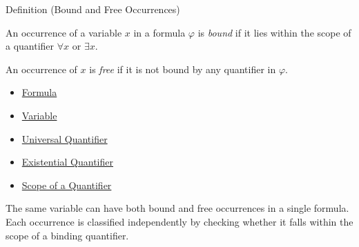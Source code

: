 \begin{definitionbox}{Definition (Bound and Free Occurrences)}
\begin{definition}\label{def:bound-free}
An occurrence of a variable $x$ in a formula $\varphi$ is \emph{bound} if it
lies within the scope of a quantifier $\forall x$ or $\exists x$.

An occurrence of $x$ is \emph{free} if it is not bound by any quantifier in
$\varphi$.
\end{definition}
\end{definitionbox}

\begin{dependencies}
\begin{itemize}
  \item \hyperref[def:formula]{Formula}
  \item \hyperref[def:variable]{Variable}
  \item \hyperref[def:universal-q]{Universal Quantifier}
  \item \hyperref[def:existential-q]{Existential Quantifier}
  \item \hyperref[def:scope]{Scope of a Quantifier}
\end{itemize}
\end{dependencies}

\begin{remark*}
The same variable can have both bound and free occurrences in a single formula.
Each occurrence is classified independently by checking whether it falls within
the scope of a binding quantifier.
\end{remark*}

